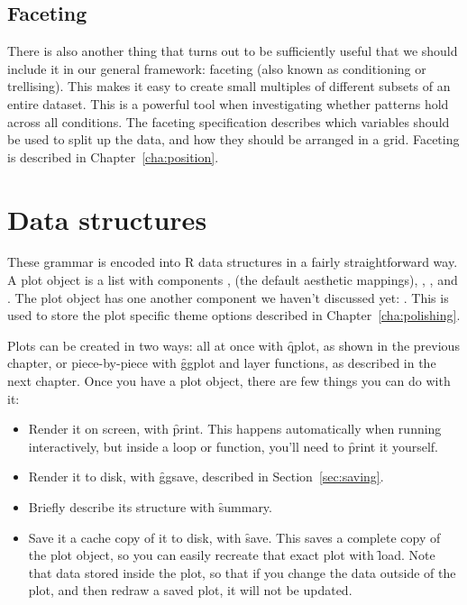 \subsection{Faceting}\label{sec:intro-faceting}

There is also another thing that turns out to be sufficiently useful that we should include it in our general framework: faceting (also known as conditioning or trellising). This makes it easy to create small multiples of different subsets of an entire dataset. This is a powerful tool when investigating whether patterns hold across all conditions.  The faceting specification describes which variables should be used to split up the data, and how they should be arranged in a grid.  Faceting is described in Chapter~\ref{cha:position}.

\section{Data structures}
\label{sec:data-structures}

These grammar is encoded into R data structures in a fairly straightforward way.  A plot object is a list with components ,  (the default aesthetic mappings), , ,  and .  The plot object has one another component we haven't discussed yet: .  This is used to store the plot specific theme options described in Chapter~\ref{cha:polishing}.  

Plots can be created in two ways: all at once with \f{qplot}, as shown in the previous chapter, or piece-by-piece with \f{ggplot} and layer functions, as described in the next chapter.  Once you have a plot object, there are few things you can do with it:

\begin{itemize}
  \item Render it on screen, with \f{print}.  This happens automatically when
  running interactively, but inside a loop or function, you'll need to
  \f{print} it yourself.
  
  \item Render it to disk, with \f{ggsave}, described in Section~\ref{sec:saving}.

  \item Briefly describe its structure with \f{summary}.
  
  \item Save it a cache copy of it to disk, with \f{save}.  This saves a complete copy of the plot object, so you can easily recreate that exact plot with \f{load}.  Note that data stored inside the plot, so that if you change the data outside of the plot, and then redraw a saved plot, it will not be updated. 
\end{itemize}


